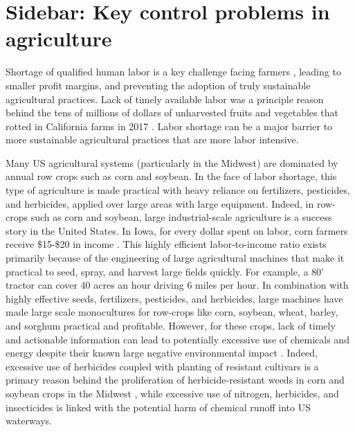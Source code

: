 \section[How can control engineers help agriculture]{Sidebar: Key control problems in agriculture}\label{sb:ag}


Shortage of qualified human labor is a key challenge facing farmers \cite{richards2018immigration,hertz2013there}, leading to smaller profit margins, and preventing the adoption of truly sustainable agricultural practices. Lack of timely available labor was a principle reason behind the tens of millions of dollars of unharvested fruits and vegetables that rotted in California farms in 2017 \cite{guthman2017paradoxes,RN4026}.  Labor shortage can be a major barrier to more sustainable agricultural practices that are more labor intensive.

Many US agricultural systems (particularly in the Midwest) are dominated by annual row crops such as corn and soybean. In the face of labor shortage, this type of agriculture is made practical with heavy reliance on fertilizers, pesticides, and herbicides, applied over large areas with large equipment. Indeed, in row-crops such as corn and soybean, large industrial-scale agriculture is a success story in the United States. In Iowa, for every dollar spent on labor, corn farmers receive \$15-\$20 in income \cite{plastina2018estimated}.  This highly efficient labor-to-income ratio exists primarily because of the engineering of large agricultural machines that make it practical to seed, spray, and harvest large fields quickly. For example, a 80' tractor can cover 40 acres an hour driving 6 miles per hour. In combination with highly effective seeds, fertilizers, pesticides, and herbicides, large machines have made large scale monocultures for row-crops like corn, soybean, wheat, barley, and sorghum practical and profitable. However, for these crops, lack of timely and actionable information can lead to potentially excessive use of chemicals and energy despite their known large negative environmental impact \cite{capellesso2016economic,foley2011solutions,Godfray2010Food}. Indeed, excessive use of herbicides coupled with planting of resistant cultivars is a primary reason behind the proliferation of herbicide-resistant weeds in corn and soybean crops in the Midwest \cite{heap2016web,livingston2016economic,gianessi2007value}, while excessive use of nitrogen, herbicides, and insecticides is linked with the potential harm of chemical runoff into US waterways.

